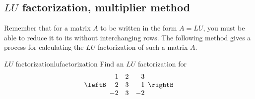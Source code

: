 \subsection{$LU$ factorization, multiplier method}

Remember that for a matrix $A$ to be written in the form $A=LU$, you must be able to reduce it to its {\ef} without interchanging rows. The following method gives a process for calculating the $LU$ factorization of such a matrix $A$. 

\begin{example}{$LU$ factorization}{lufactorization}
Find an $LU$ factorization for 
\begin{equation*}
\leftB 
\begin{array}{rrr}
1 & 2 & 3 \\ 
2 & 3 & 1 \\ 
-2 & 3 & -2
\end{array}
\rightB
\end{equation*}
\end{example}


